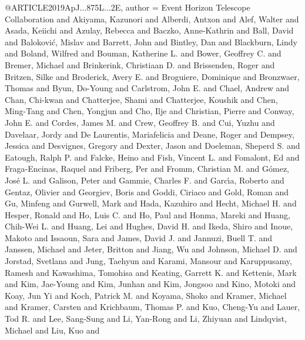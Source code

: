 {@ARTICLE{2019ApJ...875L...2E,
       author = {{Event Horizon Telescope Collaboration} and {Akiyama}, Kazunori and
         {Alberdi}, Antxon and {Alef}, Walter and {Asada}, Keiichi and
         {Azulay}, Rebecca and {Baczko}, Anne-Kathrin and {Ball}, David and
         {Balokovi{\'c}}, Mislav and {Barrett}, John and {Bintley}, Dan and
         {Blackburn}, Lindy and {Boland}, Wilfred and {Bouman}, Katherine L. and
         {Bower}, Geoffrey C. and {Bremer}, Michael and
         {Brinkerink}, Christiaan D. and {Brissenden}, Roger and
         {Britzen}, Silke and {Broderick}, Avery E. and {Broguiere}, Dominique and
         {Bronzwaer}, Thomas and {Byun}, Do-Young and {Carlstrom}, John E. and
         {Chael}, Andrew and {Chan}, Chi-kwan and {Chatterjee}, Shami and
         {Chatterjee}, Koushik and {Chen}, Ming-Tang and {Chen}, Yongjun and
         {Cho}, Ilje and {Christian}, Pierre and {Conway}, John E. and
         {Cordes}, James M. and {Crew}, Geoffrey B. and {Cui}, Yuzhu and
         {Davelaar}, Jordy and {De Laurentis}, Mariafelicia and {Deane}, Roger and
         {Dempsey}, Jessica and {Desvignes}, Gregory and {Dexter}, Jason and
         {Doeleman}, Sheperd S. and {Eatough}, Ralph P. and {Falcke}, Heino and
         {Fish}, Vincent L. and {Fomalont}, Ed and {Fraga-Encinas}, Raquel and
         {Friberg}, Per and {Fromm}, Christian M. and {G{\'o}mez}, Jos{\'e} L. and
         {Galison}, Peter and {Gammie}, Charles F. and {Garc{\'\i}a}, Roberto and
         {Gentaz}, Olivier and {Georgiev}, Boris and {Goddi}, Ciriaco and
         {Gold}, Roman and {Gu}, Minfeng and {Gurwell}, Mark and
         {Hada}, Kazuhiro and {Hecht}, Michael H. and {Hesper}, Ronald and
         {Ho}, Luis C. and {Ho}, Paul and {Honma}, Mareki and
         {Huang}, Chih-Wei L. and {Huang}, Lei and {Hughes}, David H. and
         {Ikeda}, Shiro and {Inoue}, Makoto and {Issaoun}, Sara and
         {James}, David J. and {Jannuzi}, Buell T. and {Janssen}, Michael and
         {Jeter}, Britton and {Jiang}, Wu and {Johnson}, Michael D. and
         {Jorstad}, Svetlana and {Jung}, Taehyun and {Karami}, Mansour and
         {Karuppusamy}, Ramesh and {Kawashima}, Tomohisa and
         {Keating}, Garrett K. and {Kettenis}, Mark and {Kim}, Jae-Young and
         {Kim}, Junhan and {Kim}, Jongsoo and {Kino}, Motoki and {Koay}, Jun Yi and
         {Koch}, Patrick M. and {Koyama}, Shoko and {Kramer}, Michael and
         {Kramer}, Carsten and {Krichbaum}, Thomas P. and {Kuo}, Cheng-Yu and
         {Lauer}, Tod R. and {Lee}, Sang-Sung and {Li}, Yan-Rong and
         {Li}, Zhiyuan and {Lindqvist}, Michael and {Liu}, Kuo and
}}}
